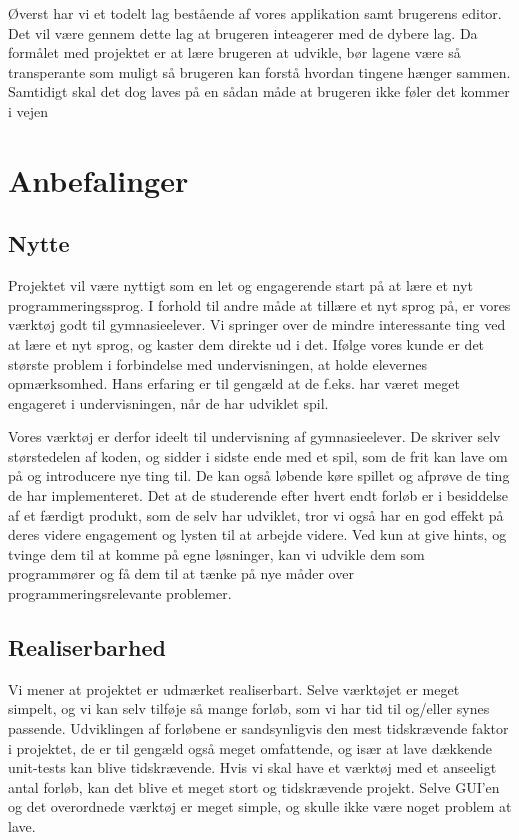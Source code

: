 \documentclass[10pt,a4paper,danish]{article}
\begin{document}
Øverst har vi et todelt lag bestående af vores applikation samt brugerens editor.
Det vil være gennem dette lag at brugeren inteagerer med de dybere lag.
Da formålet med projektet er at lære brugeren at udvikle, bør lagene være så transperante som muligt så brugeren kan forstå hvordan tingene hænger sammen. Samtidigt skal det dog laves på en sådan måde at brugeren ikke føler det kommer i vejen



\section{Anbefalinger}
\subsection{Nytte}
Projektet vil være nyttigt som en let og engagerende start på at lære et nyt programmeringssprog. I forhold til andre måde at tillære et nyt sprog på, er vores værktøj godt til gymnasieelever. Vi springer over de mindre interessante ting ved at lære et nyt sprog, og kaster dem direkte ud i det. Ifølge vores kunde er det største problem i forbindelse med undervisningen, at holde elevernes opmærksomhed. Hans erfaring er til gengæld at de f.eks. har været meget engageret i undervisningen, når de har udviklet spil. 

Vores værktøj er derfor ideelt til undervisning af gymnasieelever. De skriver selv størstedelen af koden, og sidder i sidste ende med et spil, som de frit kan lave om på og introducere nye ting til. De kan også løbende køre spillet og afprøve de ting de har implementeret. Det at de studerende efter hvert endt forløb er i besiddelse af et færdigt produkt, som de selv har udviklet, tror vi også har en god effekt på deres videre engagement og lysten til at arbejde videre. Ved kun at give hints, og tvinge dem til at komme på egne løsninger, kan vi udvikle dem som programmører og få dem til at tænke på nye måder over programmeringsrelevante problemer.

\subsection{Realiserbarhed}
Vi mener at projektet er udmærket realiserbart. Selve værktøjet er meget simpelt, og vi kan selv tilføje så mange forløb, som vi har tid til og/eller synes passende. Udviklingen af forløbene er sandsynligvis den mest tidskrævende faktor i projektet, de er til gengæld også meget omfattende, og især at lave dækkende unit-tests kan blive tidskrævende. Hvis vi skal have et værktøj med et anseeligt antal forløb, kan det blive et meget stort og tidskrævende projekt. Selve GUI'en og det overordnede værktøj er meget simple, og skulle ikke være noget problem at lave.
\end{document}
